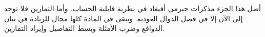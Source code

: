 \documentclass[../../include/open-logic-part]{subfiles}
\begin{document}

\begin{editorial}
  أصل هذا الجزء مذكرات جيرمي أفيغاد في نظرية قابلية الحساب. وأما
  التمارين فلا توجد إلى الآن إلا في فصل الدوال العودية. ويبقى في المادة كلها
  مجال للزيادة في بيان الدوافع وضرب الأمثلة وبسط التفاصيل وإيراد التمارين.
\end{editorial}



\OLEndPartHook
\end{document}
